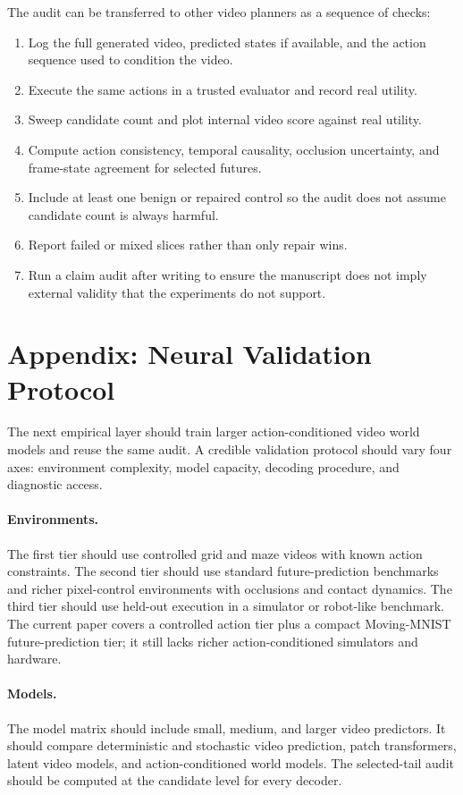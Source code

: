 \documentclass{article}
\begin{document}
The audit can be transferred to other video planners as a sequence of checks:
\begin{enumerate}
  \item Log the full generated video, predicted states if available, and the action sequence used to condition the video.
  \item Execute the same actions in a trusted evaluator and record real utility.
  \item Sweep candidate count and plot internal video score against real utility.
  \item Compute action consistency, temporal causality, occlusion uncertainty, and frame-state agreement for selected futures.
  \item Include at least one benign or repaired control so the audit does not assume candidate count is always harmful.
  \item Report failed or mixed slices rather than only repair wins.
  \item Run a claim audit after writing to ensure the manuscript does not imply external validity that the experiments do not support.
\end{enumerate}

\section{Appendix: Neural Validation Protocol}

The next empirical layer should train larger action-conditioned video world models and reuse the same audit. A credible validation protocol should vary four axes: environment complexity, model capacity, decoding procedure, and diagnostic access.

\paragraph{Environments.}
The first tier should use controlled grid and maze videos with known action constraints. The second tier should use standard future-prediction benchmarks and richer pixel-control environments with occlusions and contact dynamics. The third tier should use held-out execution in a simulator or robot-like benchmark. The current paper covers a controlled action tier plus a compact Moving-MNIST future-prediction tier; it still lacks richer action-conditioned simulators and hardware.

\paragraph{Models.}
The model matrix should include small, medium, and larger video predictors. It should compare deterministic and stochastic video prediction, patch transformers, latent video models, and action-conditioned world models. The selected-tail audit should be computed at the candidate level for every decoder.
\end{document}
